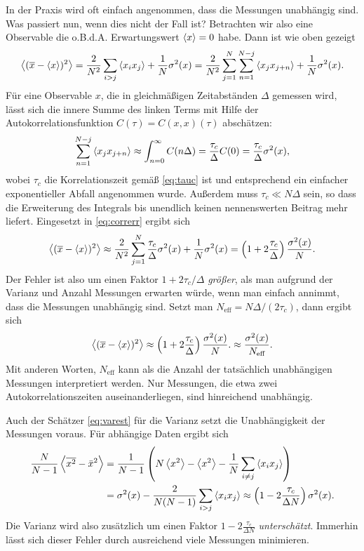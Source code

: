 In der Praxis wird oft einfach angenommen, dass die Messungen
unabhängig sind. Was passiert nun, wenn dies nicht der Fall ist?
Betrachten wir also eine Observable die o.B.d.A. Erwartungswert
$\left\langle{x}\right\rangle = 0$ habe. Dann ist wie oben gezeigt
\begin{equation}
  \label{eq:correrr}
  \left\langle{(\overline{x} - \left\langle{x}\right\rangle)^2}\right\rangle = \frac{2}{N^2}\sum_{i > j}
  \left\langle{x_ix_j}\right\rangle
  + \frac{1}{N}\sigma^2(x)
  = \frac{2}{N^2}\sum_{j=1}^{N}\sum_{n = 1}^{N-j} \left\langle{x_jx_{j+n}}\right\rangle
  + \frac{1}{N}\sigma^2(x).
\end{equation}
Für eine Observable $x$, die in gleichmäßigen Zeitabständen $\Delta$
gemessen wird, lässt sich die innere Summe des linken Terms mit Hilfe
der Autokorrelationsfunktion $C(\tau) = C(x,x)(\tau)$
abschätzen:\nobreak
\begin{equation}
  \sum_{n = 1}^{N-j} \left\langle{x_jx_{j+n}}\right\rangle
  \approx \int_{n = 0}^{\infty} C(n\Delta)
  = \frac{\tau_c}{\Delta} C(0)
  = \frac{\tau_c}{\Delta}\sigma^2(x),
\end{equation}
wobei $\tau_c$ die Korrelationszeit gemäß \eqref{eq:tauc} ist und
entsprechend ein einfacher exponentieller Abfall angenommen
wurde. Außerdem muss $\tau_c\ll N\Delta$ sein, so dass die Erweiterung
des Integrals bis unendlich keinen nennenswerten Beitrag mehr
liefert. Eingesetzt in \eqref{eq:correrr} ergibt sich
\begin{equation}
  \label{eq:correrrest}
  \left\langle{(\overline{x} - \left\langle{x}\right\rangle)^2}\right\rangle
  \approx
  \frac{2}{N^2}\sum_{j=1}^{N} \frac{\tau_c}{\Delta}\sigma^2(x)
  + \frac{1}{N}\sigma^2(x)
  =
  \left(1 + 2\frac{\tau_c}{\Delta}\right)\frac{\sigma^2(x)}{N}.
\end{equation}
Der Fehler ist also um einen Faktor $1 + 2 \tau_c /\Delta$
\emph{größer}, als man aufgrund der Varianz und Anzahl Messungen
erwarten würde, wenn man einfach annimmt, dass die Messungen
unabhängig sind. Setzt man $N_\text{eff} = N \Delta / (2\tau_c)$, dann
ergibt sich
\begin{equation}
  \left\langle{(\overline{x} - \left\langle{x}\right\rangle)^2}\right\rangle
  \approx
  \left(1 + 2\frac{\tau_c}{\Delta}\right)\frac{\sigma^2(x)}{N}.
  \approx \frac{\sigma^2(x)}{N_\text{eff}}.
\end{equation}
Mit anderen Worten, $N_\text{eff}$ kann als die Anzahl der tatsächlich
unabhängigen Messungen interpretiert werden. Nur Messungen, die etwa
zwei Autokorrelationszeiten auseinanderliegen, sind hinreichend
unabhängig.

Auch der Schätzer \eqref{eq:varest} für die Varianz setzt die
Unabhängigkeit der Messungen voraus. Für abhängige Daten ergibt sich
\begin{align}
  \frac{N}{N-1}\left\langle{\overline{x^2} - \bar{x}^2}\right\rangle
  &= \frac{1}{N-1}\left(N\left\langle{x^2}\right\rangle - \left\langle{x^2}\right\rangle
    - \frac{1}{N}\sum_{i\neq j} \left\langle{x_ix_j}\right\rangle\right)\nonumber\\
  &= \sigma^2(x) - \frac{2}{N(N-1)}\sum_{i> j} \left\langle{x_ix_j}\right\rangle
  \approx \left(1 - 2\frac{\tau_c}{\Delta N}\right)\sigma^2(x).
\end{align}
Die Varianz wird also zusätzlich um einen Faktor $1 -
2\frac{\tau_c}{\Delta N}$ \emph{unterschätzt}. Immerhin lässt sich
dieser Fehler durch ausreichend viele Messungen minimieren.

